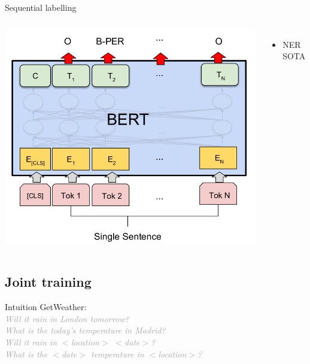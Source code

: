 \documentclass[pdf]{beamer}
\newcommand{\entity}[1]{\textcolor{ao(english)}{#1}}
\newcommand{\intent}[1]{\textcolor{azure(colorwheel)}{#1}}
\newcommand{\demo}[1]{\textit{\textcolor{darkgray}{#1}}}
\begin{document}
    \begin{frame}{Sequential labelling}
        \vspace*{-1cm}
         \begin{columns}
            \begin{center}
                \includegraphics[height=0.87\textheight]{../figures/bert_ner.png}
            \end{center}
             \begin{itemize}
                \item NER SOTA
            \end{itemize}
        \end{columns}
    \end{frame}

    \subsection{Joint training}
    \begin{frame}{Intuition}
        \intent{GetWeather}: \\[5mm]

        \demo{Will it rain in \entity{London} \entity{tomorrow}?}  \\
        \demo{What is the \entity{today's} temperature in \entity{Madrid}?} \\[5mm]

        \demo{Will it rain in \entity{$<$location$>$} \entity{$<$date$>$}?} \\
        \demo{What is the \entity{$<$date$>$} temperature in \entity{$<$location$>$}?}
    \end{frame}
\end{document}
